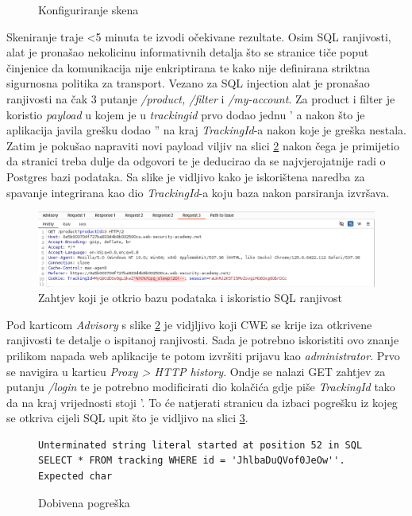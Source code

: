 \begin{figure}[H]
\begin{minipage}[b]{0.47\textwidth}
      \caption{Konfiguriranje skena}
      \label{slk:burp_config}
    \end{minipage}
  \end{figure}

\lstset{language=SQL}
Skeniranje traje <5 minuta te izvodi očekivane rezultate. Osim SQL ranjivosti, alat je pronašao nekolicinu informativnih detalja što se stranice tiče poput činjenice da komunikacija nije enkriptirana 
te kako nije definirana striktna sigurnosna politika za transport.
Vezano za SQL injection alat je pronašao ranjivosti na čak 3 putanje \textit{/product, /filter} i \textit{/my-account}. Za product i filter je koristio \textit{payload} u kojem je u
\textit{trackingid} prvo dodao jednu ' a nakon što je aplikacija javila grešku dodao '' na kraj \textit{TrackingId}-a nakon koje je greška nestala. Zatim je pokušao napraviti novi payload viljiv na slici \ref{slk:burp_auto}
nakon čega je primijetio da stranici treba dulje da odgovori te je deducirao da se najvjerojatnije radi o Postgres bazi podataka. Sa slike je vidljivo kako je iskorištena naredba za spavanje integrirana kao dio \textit{TrackingId}-a koju 
baza nakon parsiranja izvršava.

\begin{figure}[h]
  \centering
  \includegraphics[width=1\textwidth]{slike/sql_requests.png}
  \caption{Zahtjev koji je otkrio bazu podataka i iskoristio SQL ranjivost}
  \label{slk:burp_auto}
\end{figure}

Pod karticom \textit{Advisory} s slike \ref{slk:burp_auto} je vidjljivo koji CWE se krije iza otkrivene ranjivosti te detalje o ispitanoj ranjivosti. Sada je potrebno iskoristiti ovo znanje prilikom napada web aplikacije te potom izvršiti prijavu kao \textit{administrator}.
Prvo se navigira u karticu \textit{Proxy > HTTP history}. Ondje se nalazi GET zahtjev za putanju \textit{/login} te je potrebno modificirati dio kolačića gdje piše \textit{TrackingId} tako da na kraj vrijednosti stoji '.
To će natjerati stranicu da izbaci pogrešku iz kojeg se otkriva cijeli SQL upit što je vidljivo na slici \ref{slk:err_test}.

\begin{figure}[]
    \begin{lstlisting}[frame=single, breaklines]
        Unterminated string literal started at position 52 in SQL SELECT * FROM tracking WHERE id = 'JhlbaDuQVof0JeOw''. Expected char
    \end{lstlisting}
    \caption{Dobivena pogreška}
    \label{slk:err_test}
\end{figure}

